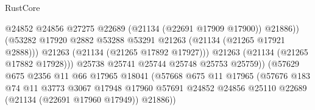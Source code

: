 \begin{lexlean}{RustCore}
\begin{coremodule}
                                                  @24852
                                                  @24856
                                                  @27275
                                                  @22689
                                                  (@21134 (@22691 @17909 @17900))
                                                  @21886))
                                              (@53282
                                                @17920
                                                @2882
                                                @53288
                                                @53291
                                                @21263
                                                (@21134 (@21265 @17921 @2888)))
                                              @21263
                                              (@21134 (@21265 @17892 @17927)))
                                            @21263
                                            (@21134 (@21265 @17882 @17928)))
                                          @25738
                                          @25741
                                          @25744
                                          @25748
                                          @25753
                                          @25759))
                                      (@57629
                                        @675
                                        @2356
                                        @11
                                        @66
                                        @17965
                                        @18041
                                        (@57668
                                          @675
                                          @11
                                          @17965
                                          (@57676
                                            @183
                                            @74
                                            @11
                                            @3773
                                            @3067
                                            @17948
                                            @17960
                                            @57691
                                            @24852
                                            @24856
                                            @25110
                                            @22689
                                            (@21134 (@22691 @17960 @17949))
                                            @21886))

\end{coremodule}
\end{lexlean}
